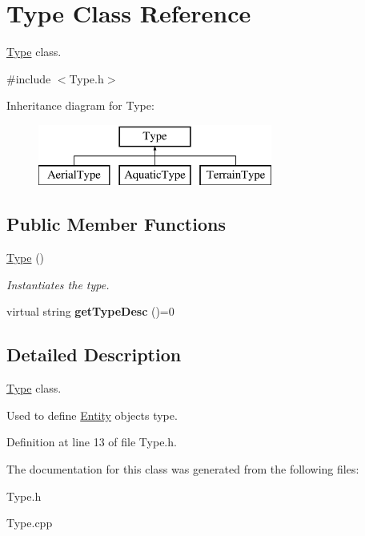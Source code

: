 \hypertarget{classType}{}\section{Type Class Reference}
\label{classType}


\hyperlink{classType}{Type} class.  




{\ttfamily \#include $<$Type.\+h$>$}

Inheritance diagram for Type\+:\begin{figure}[H]
\begin{center}
\leavevmode
\includegraphics[height=2.000000cm]{classType}
\end{center}
\end{figure}
\subsection*{Public Member Functions}
\begin{DoxyCompactItemize}
\item 
\mbox{\label{classType_a78339313d36891f18427c431ea84e306}} 
\hyperlink{classType_a78339313d36891f18427c431ea84e306}{Type} ()
\begin{DoxyCompactList}\small\item\em Instantiates the type. \end{DoxyCompactList}\item 
\mbox{\label{classType_a5c453300dc060252c30534110bd2f78c}} 
virtual string {\bfseries get\+Type\+Desc} ()=0
\end{DoxyCompactItemize}


\subsection{Detailed Description}
\hyperlink{classType}{Type} class. 

Used to define \hyperlink{classEntity}{Entity} objects type. 

Definition at line 13 of file Type.\+h.



The documentation for this class was generated from the following files\+:\begin{DoxyCompactItemize}
\item 
Type.\+h\item 
Type.\+cpp\end{DoxyCompactItemize}
